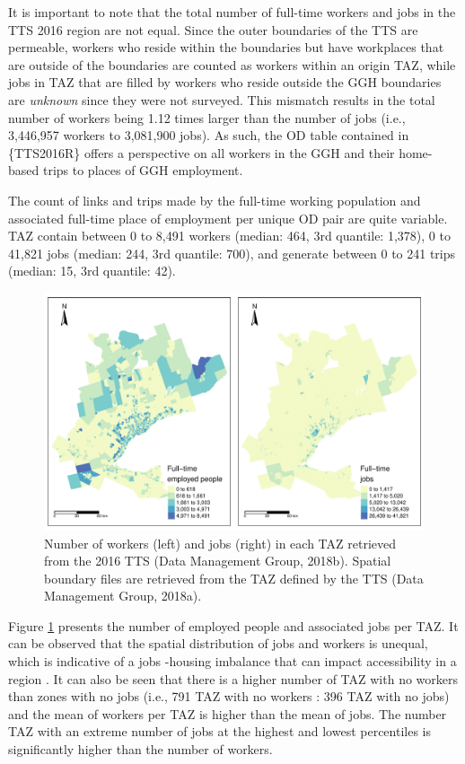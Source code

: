 \documentclass[Royal,times,sageh]{sagej}
\begin{document}
It is important to note that the total number of full-time workers and
jobs in the TTS 2016 region are not equal. Since the outer boundaries of
the TTS are permeable, workers who reside within the boundaries but have
workplaces that are outside of the boundaries are counted as workers
within an origin TAZ, while jobs in TAZ that are filled by workers who
reside outside the GGH boundaries are \emph{unknown} since they were not
surveyed. This mismatch results in the total number of workers being
1.12 times larger than the number of jobs (i.e., 3,446,957 workers to
3,081,900 jobs). As such, the OD table contained in \{TTS2016R\} offers
a perspective on all workers in the GGH and their home-based trips to
places of GGH employment.

The count of links and trips made by the full-time working population
and associated full-time place of employment per unique OD pair are
quite variable. TAZ contain between 0 to 8,491 workers (median: 464, 3rd
quantile: 1,378), 0 to 41,821 jobs (median: 244, 3rd quantile: 700), and
generate between 0 to 241 trips (median: 15, 3rd quantile: 42).

\begin{figure}
\includegraphics[width=1\linewidth]{Manuscript-Data-Package_files/figure-latex/tts-workers-jobs-plot-1} \caption{\label{fig:tts-workers-jobs-plot}Number of workers (left) and jobs (right) in each TAZ retrieved from the 2016 TTS (Data Management Group, 2018b). Spatial boundary files are retrieved from the TAZ defined by the TTS (Data Management Group, 2018a).}\label{fig:tts-workers-jobs-plot}
\end{figure}

Figure \ref{fig:tts-workers-jobs-plot} presents the number of employed
people and associated jobs per TAZ. It can be observed that the spatial
distribution of jobs and workers is unequal, which is indicative of a
jobs -housing imbalance that can impact accessibility in a region
\citep{Levine1998rethinking}. It can also be seen that there is a higher
number of TAZ with no workers than zones with no jobs (i.e., 791 TAZ
with no workers : 396 TAZ with no jobs) and the mean of workers per TAZ
is higher than the mean of jobs. The number TAZ with an extreme number
of jobs at the highest and lowest percentiles is significantly higher
than the number of workers.
\end{document}
